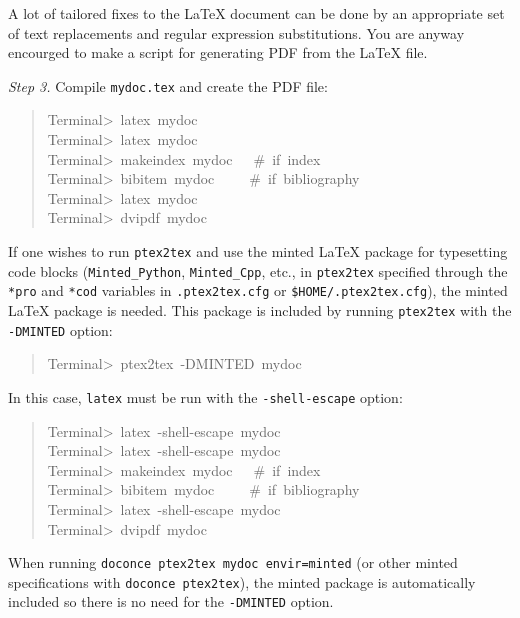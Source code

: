 \documentclass[a4paper]{article}
\begin{document}
A lot of tailored fixes to the LaTeX document can be done by
an appropriate set of text replacements and regular expression
substitutions. You are anyway encourged to make a script for
generating PDF from the LaTeX file.

\emph{Step 3.} Compile \texttt{mydoc.tex}
and create the PDF file:
%
\begin{quote}{\ttfamily \raggedright \noindent
Terminal>~latex~mydoc\\
Terminal>~latex~mydoc\\
Terminal>~makeindex~mydoc~~~\#~if~index\\
Terminal>~bibitem~mydoc~~~~~\#~if~bibliography\\
Terminal>~latex~mydoc\\
Terminal>~dvipdf~mydoc
}
\end{quote}

If one wishes to run \texttt{ptex2tex} and use the minted LaTeX package for
typesetting code blocks (\texttt{Minted\_Python}, \texttt{Minted\_Cpp}, etc., in
\texttt{ptex2tex} specified through the \texttt{*pro} and \texttt{*cod} variables in
\texttt{.ptex2tex.cfg} or \texttt{\$HOME/.ptex2tex.cfg}), the minted LaTeX package is
needed.  This package is included by running \texttt{ptex2tex} with the
\texttt{-DMINTED} option:
%
\begin{quote}{\ttfamily \raggedright \noindent
Terminal>~ptex2tex~-DMINTED~mydoc
}
\end{quote}

In this case, \texttt{latex} must be run with the
\texttt{-shell-escape} option:
%
\begin{quote}{\ttfamily \raggedright \noindent
Terminal>~latex~-shell-escape~mydoc\\
Terminal>~latex~-shell-escape~mydoc\\
Terminal>~makeindex~mydoc~~~\#~if~index\\
Terminal>~bibitem~mydoc~~~~~\#~if~bibliography\\
Terminal>~latex~-shell-escape~mydoc\\
Terminal>~dvipdf~mydoc
}
\end{quote}

When running \texttt{doconce ptex2tex mydoc envir=minted} (or other minted
specifications with \texttt{doconce ptex2tex}), the minted package is automatically
included so there is no need for the \texttt{-DMINTED} option.


\end{document}
